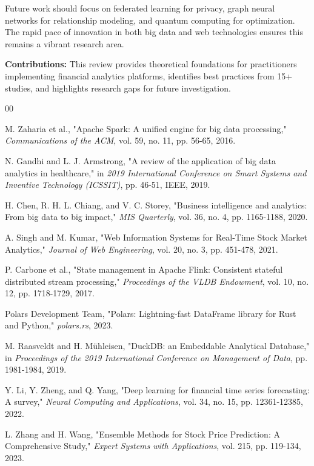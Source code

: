 \documentclass[conference]{IEEEtran}
\begin{document}
Future work should focus on federated learning for privacy, graph neural networks for relationship modeling, and quantum computing for optimization. The rapid pace of innovation in both big data and web technologies ensures this remains a vibrant research area.

\textbf{Contributions:}
This review provides theoretical foundations for practitioners implementing financial analytics platforms, identifies best practices from 15+ studies, and highlights research gaps for future investigation.

\begin{thebibliography}{00}

 M. Zaharia et al., "Apache Spark: A unified engine for big data processing," \textit{Communications of the ACM}, vol. 59, no. 11, pp. 56-65, 2016.

 N. Gandhi and L. J. Armstrong, "A review of the application of big data analytics in healthcare," in \textit{2019 International Conference on Smart Systems and Inventive Technology (ICSSIT)}, pp. 46-51, IEEE, 2019.

 H. Chen, R. H. L. Chiang, and V. C. Storey, "Business intelligence and analytics: From big data to big impact," \textit{MIS Quarterly}, vol. 36, no. 4, pp. 1165-1188, 2020.

 A. Singh and M. Kumar, "Web Information Systems for Real-Time Stock Market Analytics," \textit{Journal of Web Engineering}, vol. 20, no. 3, pp. 451-478, 2021.

 P. Carbone et al., "State management in Apache Flink: Consistent stateful distributed stream processing," \textit{Proceedings of the VLDB Endowment}, vol. 10, no. 12, pp. 1718-1729, 2017.

 Polars Development Team, "Polars: Lightning-fast DataFrame library for Rust and Python," \textit{polars.rs}, 2023.

 M. Raasveldt and H. Mühleisen, "DuckDB: an Embeddable Analytical Database," in \textit{Proceedings of the 2019 International Conference on Management of Data}, pp. 1981-1984, 2019.

 Y. Li, Y. Zheng, and Q. Yang, "Deep learning for financial time series forecasting: A survey," \textit{Neural Computing and Applications}, vol. 34, no. 15, pp. 12361-12385, 2022.

 L. Zhang and H. Wang, "Ensemble Methods for Stock Price Prediction: A Comprehensive Study," \textit{Expert Systems with Applications}, vol. 215, pp. 119-134, 2023.


\end{thebibliography}
\end{document}

